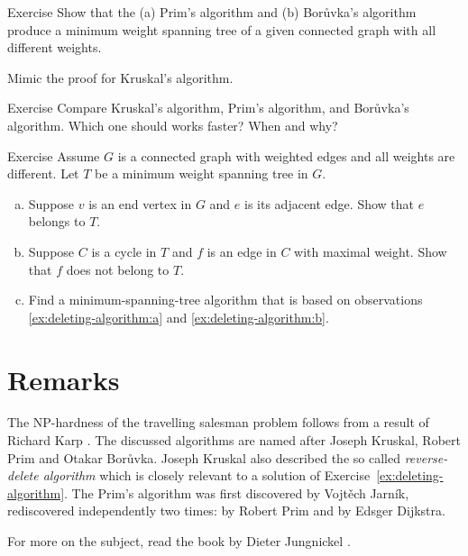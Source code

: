 \begin{thm}{Exercise}
Show that the (a) Prim's algorithm and (b) Borůvka's algorithm produce a minimum weight spanning tree of a given connected graph with all different weights.
\end{thm}

 Mimic the proof for Kruskal’s algorithm.

\begin{thm}{Exercise}
Compare Kruskal’s algorithm, Prim's algorithm, and Borůvka's algorithm.
Which one should works faster?
When and why?
\end{thm}

\begin{thm}{Exercise}\label{ex:deleting-algorithm}
Assume $G$ is a connected graph with weighted edges and all weights are different.
Let $T$ be a minimum weight spanning tree in $G$.
\begin{enumerate}[(a)]
\item\label{ex:deleting-algorithm:a} Suppose $v$ is an end vertex in $G$ and $e$ is its adjacent edge.
Show that $e$ belongs to $T$.
\item\label{ex:deleting-algorithm:b} Suppose $C$ is a cycle in $T$ and $f$ is an edge in $C$ with maximal weight.
Show that $f$ does not belong to $T$.
\item Find a minimum-spanning-tree algorithm that is based on observations \ref{ex:deleting-algorithm:a} and \ref{ex:deleting-algorithm:b}.
\end{enumerate}
\end{thm}

\section*{Remarks}

The NP-hardness of the travelling salesman problem follows from a result of Richard Karp \cite{karp}.
The discussed algorithms are named after Joseph Kruskal, Robert Prim and Otakar Borůvka.
Joseph Kruskal also described the so called \emph{reverse-delete algorithm} \cite{kruskal} which is closely relevant to a solution of Exercise~\ref{ex:deleting-algorithm}.
The Prim's algorithm was first discovered by Vojtěch Jarník,
rediscovered  independently two times: by Robert Prim and by Edsger Dijkstra.

For more on the subject, read the book by Dieter Jungnickel \cite{jungnickel}.

